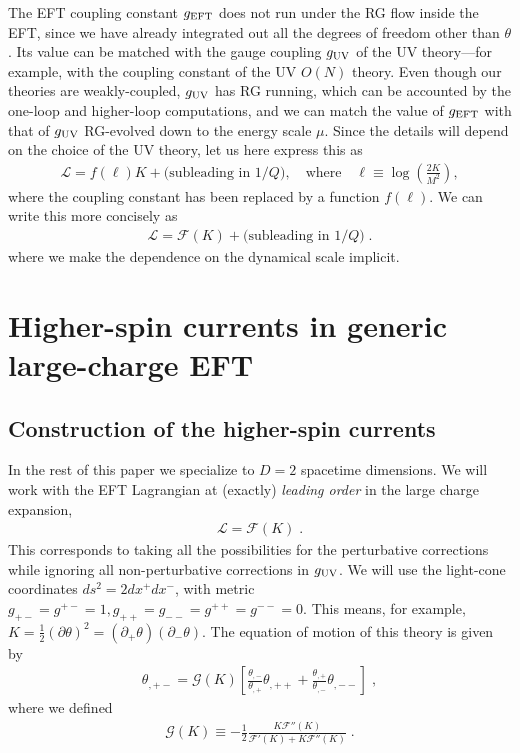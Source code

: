 \documentclass[12pt]{article}
\begin{document}
The EFT coupling constant $g_{\rm EFT}$ does not run under the RG  flow inside the EFT, since we have already integrated out
all the degrees of freedom other than $\theta$. 
Its value can be matched
 with the gauge coupling $g_{\rm UV}$ of the UV theory---for example,
with the coupling constant of the UV $O(N)$ theory.
Even though our theories are weakly-coupled, $g_{\rm UV}$ has RG running,
which can be accounted by the one-loop and higher-loop computations, and we can match the value of $g_{\rm EFT}$ with that of $g_{\rm UV}$ RG-evolved down to the energy scale $\mu$.
Since the details will depend on the choice of the UV theory, 
let us here express this as
\begin{align}
    \mathcal{L} = f(\ell)K+ \text{(subleading in $1/Q$)},
    \quad \text{where} \quad \ell\equiv \log\left(\frac{2K}{M^2}\right),
\end{align}
where the coupling constant has been replaced by a function $f(\ell)$.
We can 
write this more concisely as 
\begin{align}
    \mathcal{L} = \mathcal{F}(K)+ \text{(subleading in $1/Q$)} \;.
\end{align}
where we make the dependence on the dynamical scale implicit.

\section{Higher-spin currents in generic large-charge EFT}\label{sec:ConservedCurrent}

\subsection{Construction of the higher-spin currents}

In the rest of this paper we specialize to $D=2$ spacetime dimensions. We will work with the EFT Lagrangian at (exactly) \textit{leading order} in the large charge expansion,
\begin{align}
\mathcal{L} = \mathcal{F}(K) \;.
\label{eq:most-generic-EFT}
\end{align}
This corresponds to taking all the possibilities for the perturbative corrections while ignoring all non-perturbative corrections in $g_{\rm UV}$.
We will use the light-cone coordinates $ds^2 = 2 dx^+ dx^-$,
with metric $g_{+-}=g^{+-}=1, g_{++}=g_{--}=g^{++}=g^{--}=0$.
This means, for example, $K = \frac{1}{2} (\partial \theta)^2  = (\partial_+ \theta) (\partial_- \theta)$.
The equation of motion of this theory is given by
\begin{align}
\label{eq:eom}
\theta_{,+-} = \mathcal{G}(K) \left[
   \frac{\theta_{,-}}{\theta_{,+}}  \theta_{,++}  + \frac{\theta_{,+}}{\theta_{,-}}  \theta_{,--} 
\right] \;,
\end{align}
where we defined
\begin{align}
\mathcal{G}(K) \equiv -\frac{1}{2} \frac{K \mathcal{F}''(K)}{\mathcal{F}'(K) + K \mathcal{F}''(K)} \;.
\end{align}
\end{document}
